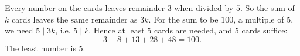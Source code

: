 Every number on the cards leaves remainder $3$ when divided by $5$. So the sum of $k$ cards leaves the same remainder as $3k$. For the sum to be $100$, a multiple of $5$, we need $5\mid3k$, i.e. $5\mid k$. Hence at least $5$ cards are needed, and $5$ cards suffice:
\[3+8+13+28+48=100.\]
The least number is $\boxed{5}$.
